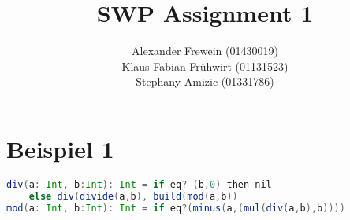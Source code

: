 \documentclass[12pt,runningheads,a4paper]{llncs}
\begin{document}
\title{SWP Assignment 1}


%
%
\author{Alexander Frewein (01430019)\\
		Klaus Fabian Frühwirt (01131523)\\
		Stephany Amizic (01331786)}

%




\maketitle




\bigskip
\bigskip
\section*{Beispiel 1}
\begin{lstlisting}[language=scala]
div(a: Int, b:Int): Int = if eq? (b,0) then nil 
    else div(divide(a,b), build(mod(a,b))
mod(a: Int, b:Int): Int = if eq?(minus(a,(mul(div(a,b),b))))
\end{lstlisting}
\end{document}
